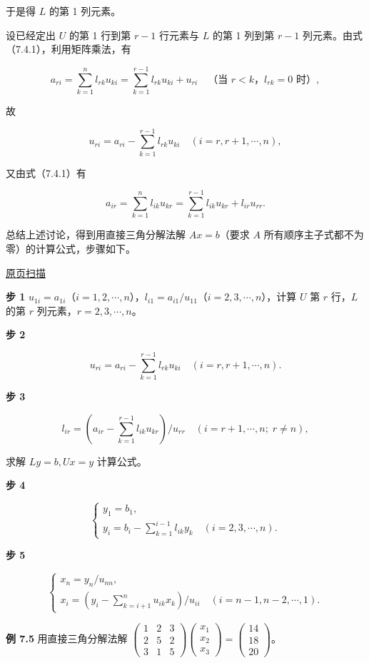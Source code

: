 \documentclass[
  10pt,
  fontset=fandol]{ctexart}
\begin{document}
于是得 \(L\) 的第 1 列元素。

设已经定出 \(U\) 的第 1 行到第 \(r-1\) 行元素与 \(L\) 的第 1 列到第 \(r-1\) 列元素。由式（7.4.1），利用矩阵乘法，有

\[a_{ri}=\sum_{k=1}^{n}l_{rk}u_{ki}=\sum_{k=1}^{r-1}l_{rk}u_{ki}+u_{ri}\quad\text{（当 $r<k$，$l_{rk}=0$ 时）},\]

故

\[u_{ri}=a_{ri}-\sum_{k=1}^{r-1}l_{rk}u_{ki}\quad(i=r,r+1,\cdots,n),\]

又由式（7.4.1）有

\[a_{ir}=\sum_{k=1}^{n}l_{ik}u_{kr}=\sum_{k=1}^{r-1}l_{ik}u_{kr}+l_{ir}u_{rr}.\]

总结上述讨论，得到用直接三角分解法解 \(Ax=b\)（要求 \(A\) 所有顺序主子式都不为零）的计算公式，步骤如下。

\href{../../source-images/pdf-192.jpeg}{原页扫描}

\textbf{步 1} \(u_{1i}=a_{1i}\)（\(i=1,2,\cdots,n\)），\(l_{i1}=a_{i1}/u_{11}\)（\(i=2,3,\cdots,n\)），计算 \(U\) 第 \(r\) 行，\(L\) 的第 \(r\) 列元素，\(r=2,3,\cdots,n\)。

\textbf{步 2}

\[u_{ri}=a_{ri}-\sum_{k=1}^{r-1}l_{rk}u_{ki}\quad(i=r,r+1,\cdots,n).\tag{7.4.2}\]

\textbf{步 3}

\[l_{ir}=\left(a_{ir}-\sum_{k=1}^{r-1}l_{ik}u_{kr}\right)/u_{rr}\quad(i=r+1,\cdots,n;\;r\ne n),\tag{7.4.3}\]

求解 \(Ly=b,Ux=y\) 计算公式。

\textbf{步 4}

\[
\begin{cases}
y_1=b_1,\\
y_i=\displaystyle b_i-\sum_{k=1}^{i-1}l_{ik}y_k\quad(i=2,3,\cdots,n).
\end{cases}
\tag{7.4.4}
\]

\textbf{步 5}

\[
\begin{cases}
x_n=y_n/u_{nn},\\
x_i=\displaystyle\left(y_i-\sum_{k=i+1}^{n}u_{ik}x_k\right)/u_{ii}\quad(i=n-1,n-2,\cdots,1).
\end{cases}
\tag{7.4.5}
\]

\textbf{例 7.5} 用直接三角分解法解 \(\begin{pmatrix}1&2&3\\2&5&2\\3&1&5\end{pmatrix}\begin{pmatrix}x_1\\x_2\\x_3\end{pmatrix}=\begin{pmatrix}14\\18\\20\end{pmatrix}\)。
\end{document}
